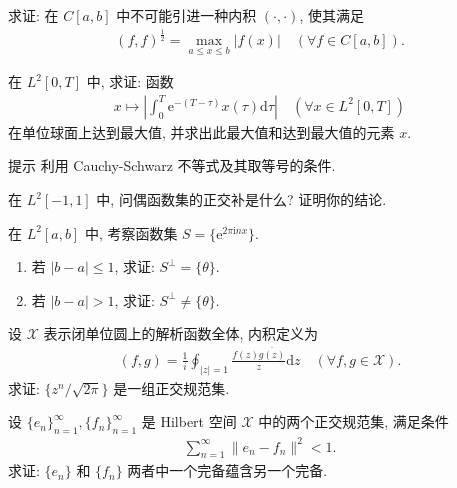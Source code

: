 \documentclass[../../main.tex]{subfiles}%
\begin{document}
\begin{example}
求证: 在 $C[a,b]$ 中不可能引进一种内积 $(\cdot,\cdot)$, 使其满足
\begin{align*}
(f,f)^\frac{1}{2}=\max_{a\leqslant x\leqslant b}|f(x)|\quad(\forall f\in C[a,b]).
\end{align*}
\end{example}

\begin{example}
在 $L^2[0,T]$ 中, 求证: 函数
\begin{align*}
x\mapsto\left|\int_0^T\mathrm{e}^{-(T-\tau)}x(\tau)\mathrm{d}\tau\right|\quad(\forall x\in L^2[0,T])
\end{align*}
在单位球面上达到最大值, 并求出此最大值和达到最大值的元素 $x$.
\end{example}
\begin{note}
提示 利用 Cauchy-Schwarz 不等式及其取等号的条件.
\end{note}

\begin{example}
在 $L^2[-1,1]$ 中, 问偶函数集的正交补是什么? 证明你的结论.
\end{example}

\begin{example}
在 $L^2[a,b]$ 中, 考察函数集 $S=\{\mathrm{e}^{2\pi \mathrm{i}nx}\}$.
\begin{enumerate}[(1)]
\item 若 $|b-a|\leqslant 1$, 求证: $S^\perp=\{\theta\}$.
\item 若 $|b-a|>1$, 求证: $S^\perp\neq\{\theta\}$.
\end{enumerate}
\end{example}

\begin{example}
设 $\mathscr{X}$ 表示闭单位圆上的解析函数全体, 内积定义为
\begin{align*}
(f,g)=\frac{1}{i}\oint_{|z|=1}\frac{f(z)\overline{g(z)}}{z}\mathrm{d}z\quad(\forall f,g\in\mathscr{X}).
\end{align*}
求证: $\{z^n/\sqrt{2\pi}\}$ 是一组正交规范集.
\end{example}

\begin{example}
设 $\{e_n\}_{n=1}^\infty,\{f_n\}_{n=1}^\infty$ 是 Hilbert 空间 $\mathscr{X}$ 中的两个正交规范集, 满足条件
\begin{align*}
\sum\limits_{n=1}^\infty\|e_n-f_n\|^2<1.
\end{align*}
求证: $\{e_n\}$ 和 $\{f_n\}$ 两者中一个完备蕴含另一个完备.
\end{example}
\end{document}
